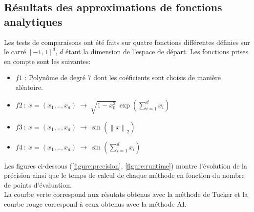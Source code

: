 \subsection{Résultats des approximations de fonctions analytiques}
Les tests de comparaisons ont été faits sur quatre fonctions différentes définies sur le carré $\left [ -1,1 \right ] ^d$, $d$ étant la dimension de l'espace de départ. Les fonctions prises en compte sont les suivantes:
\begin{itemize}
	\item $f1$ : Polynôme de degré $7$ dont les coéficients sont choisis de manière aléatoire.
	\item $f2\ :\ x=(x_1,..,x_d)\ \rightarrow \ \sqrt{1-x_0^2}\ \exp(\sum_{i=1}^dx_i)$
	\item $f3\ :\ x=(x_1,..,x_d)\ \rightarrow \ \sin(\left \| x \right \|_2)$
	\item $f4\ :\ x=(x_1,..,x_d)\ \rightarrow \ \sin(\sum_{i=1}^dx_i)$
\end{itemize}

Les figures ci-dessous (\ref{figure:precision}, \ref{figure:runtime}) montre l'évolution de la précision ainsi que le temps de calcul de chaque méthode en fonction du nombre de points d'évaluation.\\
La courbe verte correspond aux résutats obtenus avec la méthode de Tucker et la courbe rouge correspond à ceux obtenus avec la méthode AI.

